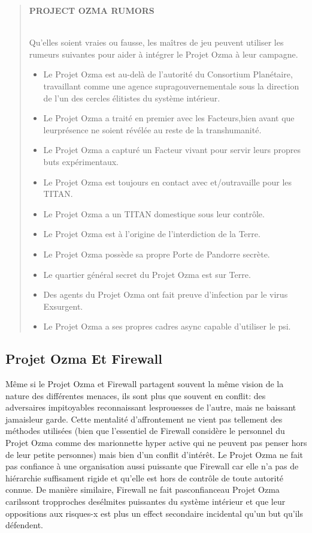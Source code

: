 {\begin{quotation} \begin{large} \textbf{PROJECT OZMA RUMORS} \end{large} \\ Qu'elles soient vraies ou fausse, les maîtres de jeu peuvent utiliser les rumeurs suivantes pour aider à intégrer le Projet Ozma à leur campagne. \begin{itemize} \item Le Projet Ozma est au-delà de l'autorité du Consortium Planétaire, travaillant comme une agence supragouvernementale sous la direction de l'un des cercles élitistes du système intérieur. \item Le Projet Ozma a traité en premier avec les Facteurs,bien avant que leurprésence ne soient révélée au reste de la transhumanité. \item Le Projet Ozma a capturé un Facteur vivant pour servir leurs propres buts expérimentaux. \item Le Projet Ozma est toujours en contact avec et/outravaille pour les TITAN. \item Le Projet Ozma a un TITAN domestique sous leur contrôle. \item Le Projet Ozma est à l'origine de l'interdiction de la Terre. \item Le Projet Ozma possède sa propre Porte de Pandorre secrète. \item Le quartier général secret du Projet Ozma est sur Terre. \item Des agents du Projet Ozma ont fait preuve d'infection par le virus Exsurgent. \item Le Projet Ozma a ses propres cadres async capable d'utiliser le psi. \end{itemize} \end{quotation} 

\subsection{Projet Ozma Et Firewall } 

Même si le Projet Ozma et Firewall partagent souvent la même vision de la nature des différentes menaces, ils sont plus que souvent en conflit: des adversaires impitoyables reconnaissant lesprouesses de l'autre, mais ne baissant jamaisleur garde. Cette mentalité d'affrontement ne vient pas tellement des méthodes utilisées (bien que l'essentiel de Firewall considère le personnel du Projet Ozma comme des marionnette hyper active qui ne peuvent pas penser hors de leur petite personnes) mais bien d'un conflit d'intérêt. Le Projet Ozma ne fait pas confiance à une organisation aussi puissante que Firewall car elle n'a pas de hiérarchie suffisament rigide et qu'elle est hors de contrôle de toute autorité connue. De manière similaire, Firewall ne fait pasconfianceau Projet Ozma carilssont tropproches desélmites puissantes du système intérieur et que leur oppositions aux risques-x est plus un effect secondaire incidental qu'un but qu'ils défendent. 



}
